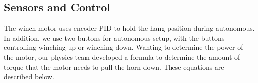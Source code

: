 \begin{figure}[htp]
\begin{minipage}{.32\textwidth}
\end{minipage}
\end{figure}

\subsection*{Sensors and Control}
The winch motor uses encoder PID to hold the hang position during autonomous. In addition, we use two buttons for autonomous setup, with the buttons controlling winching up or winching down. Wanting to determine the power of the motor, our physics team developed a formula to determine the amount of torque that the motor needs to pull the horn down. These equations are described below. 
